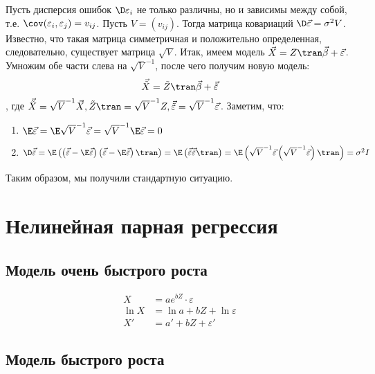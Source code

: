 Пусть дисперсия ошибок \(\D \varepsilon_i\) не только различны, но и зависимы между собой, т.е. \(\cov(\varepsilon_i, \varepsilon_j) = v_{ij}\). Пусть \(V = (v_{ij})\). Тогда матрица ковариаций \(\D \vec{\varepsilon} = \sigma^2 V\). Известно, что такая матрица симметричная и положительно определенная, следовательно, существует матрица \(\sqrt{V}\). Итак, имеем модель \(\vec{X} = Z\tran \vec{\beta} + \vec{\varepsilon}\). Умножим обе части слева на \(\sqrt{V}^{-1}\), после чего получим новую модель:
\[\vec{\tilde{X}} = \tilde{Z}\tran \vec{\beta} + \vec{\tilde{\varepsilon}}\]
, где \(\vec{\tilde{X}} = \sqrt{V}^{-1} \vec{X}, \tilde{Z}\tran = \sqrt{V}^{-1} Z, \vec{\tilde{\varepsilon}} = \sqrt{V}^{-1} \vec{\varepsilon}\).
Заметим, что:
\begin{enumerate}
    \item \(\E \vec{\varepsilon} = \E \sqrt{V}^{-1} \vec{\varepsilon} = \sqrt{V}^{-1} \E \vec{\varepsilon} = 0\)
    \item \(\D \vec{\tilde{\varepsilon}} = \E \left(\left(\vec{\tilde{\varepsilon}} - \E \vec{\tilde{\varepsilon}}\right)\left(\vec{\tilde{\varepsilon}} - \E \vec{\tilde{\varepsilon}}\right)\tran\right) = \E \left(\vec{\tilde{\varepsilon}} \vec{\tilde{\varepsilon}}\tran\right) = \E \left(\sqrt{V}^{-1} \vec{\varepsilon} \left(\sqrt{V}^{-1} \vec{\varepsilon}\right)\tran\right) = \sigma^2 I\)
\end{enumerate}
Таким образом, мы получили стандартную ситуацию.

\section{Нелинейная парная регрессия}

\subsection{Модель очень быстрого роста}

\begin{align*}
    X     & = ae^{bZ} \cdot \varepsilon    \\
    \ln X & = \ln a + bZ + \ln \varepsilon \\
    X'    & = a' + bZ + \varepsilon'
\end{align*}

\subsection{Модель быстрого роста}


